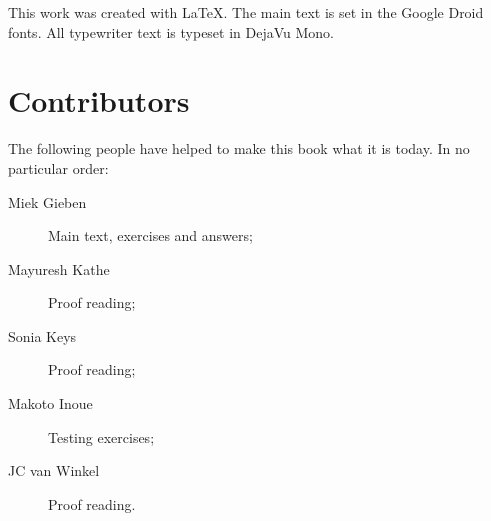 \noindent{}This work was created with \LaTeX. The main text is set in
the Google Droid fonts. All typewriter text is typeset in DejaVu Mono.

\section{Contributors}
The following people have helped to make this book what it is today.
In no particular order:
\begin{description}
\item[Miek Gieben] 
{Main text, exercises and answers;}
\item[Mayuresh Kathe]
{Proof reading;}
\item[Sonia Keys]
{Proof reading;}
\item[Makoto Inoue]
{Testing exercises;}
\item[JC van Winkel]
{Proof reading.}
\end{description}
